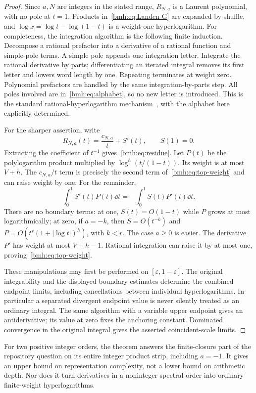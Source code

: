 \begin{proof}
Since $a,N$ are integers in the stated range, $R_{N,a}$ is a Laurent
polynomial, with no pole at $t=1$. Products in~\eqref{bmh:eq:Landen-G}
are expanded by shuffle, and
$\log x=\log t-\log(1-t)$ is a weight-one hyperlogarithm.
For completeness, the integration algorithm is the following finite
induction. Decompose a rational prefactor into a derivative of a rational
function and simple-pole terms. A simple pole appends one integration
letter. Integrate the rational derivative by parts; differentiating an
iterated integral removes its first letter and lowers word length by
one. Repeating terminates at weight zero. Polynomial prefactors are
handled by the same integration-by-parts step. All poles involved are
in~\eqref{bmh:eq:alphabet}, so no new letter is introduced. This is the
standard rational-hyperlogarithm mechanism~\cite[Section 2.2]{Panzer},
with the alphabet here explicitly determined.

For the sharper assertion, write
\[
 R_{N,a}(t)=\frac{c_{N,a}}t+S'(t),\qquad S(1)=0.
\]
Extracting the coefficient of $t^{-1}$ gives~\eqref{bmh:eq:residue}.
Let $P(t)$ be the polylogarithm product multiplied by
$\log^h(t/(1-t))$. Its weight is at most $V+h$. The $c_{N,a}/t$
term is precisely the second term of~\eqref{bmh:eq:top-weight} and can
raise weight by one. For the remainder,
\[
 \int_0^1S'(t)P(t)\dd t=-\int_0^1S(t)P'(t)\dd t.
\]
There are no boundary terms: at one, $S(t)=O(1-t)$ while $P$ grows at
most logarithmically; at zero, if $a=-k$, then $S=O(t^{-k})$ and
$P=O(t^r(1+|\log t|)^h)$, with $k<r$. The case $a\ge0$ is easier.
The derivative $P'$ has weight at most $V+h-1$. Rational integration
can raise it by at most one, proving~\eqref{bmh:eq:top-weight}.

These manipulations may first be performed on $[\varepsilon,1-\varepsilon]$.
The original integrability and the displayed boundary estimates determine
the combined endpoint limits, including cancellations between individual
hyperlogarithms. In particular a separated divergent endpoint value is
never silently treated as an ordinary integral. The same algorithm with
a variable upper endpoint gives an antiderivative; its value at zero
fixes the anchoring constant. Dominated convergence in the original
integral gives the asserted coincident-scale limits.
\end{proof}

\begin{remark}
For two positive integer orders, the theorem answers the finite-closure
part of the repository question on its entire integer product strip,
including $a=-1$. It gives an upper bound on representation complexity,
not a lower bound on arithmetic depth. Nor does it turn derivatives in
a noninteger spectral order into ordinary finite-weight hyperlogarithms.
\end{remark}
